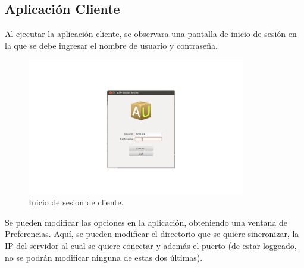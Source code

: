 \documentclass{article}
\begin{document}
\subsection{Aplicación Cliente}
\smallskip
	Al ejecutar la aplicación cliente, se observara una pantalla de inicio de sesión en la que se debe ingresar el nombre de usuario y contraseña. 
	\begin{figure}[h]
       \centering
       \includegraphics[width=0.85\textwidth]{InicioSesionCli.png}
	\bigskip
       \caption{Inicio de sesion de cliente.}
	\end{figure}
	Se pueden modificar las opciones en la aplicación, obteniendo una ventana de Preferencias. Aquí, se pueden modificar el directorio que se quiere sincronizar, la IP del servidor al cual se quiere conectar y además el puerto (de estar loggeado, no se podrán modificar ninguna de estas dos últimas).
\end{document}
